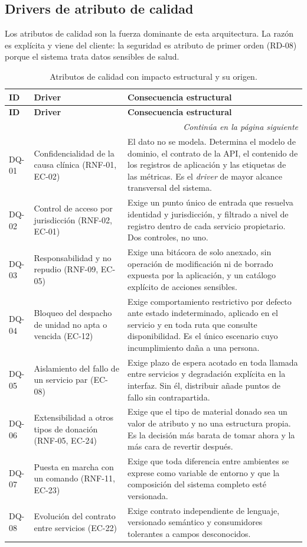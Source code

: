 \documentclass[11pt,a4paper]{article}
\newcommand{\contlinea}[1]{\multicolumn{#1}{r}{\footnotesize\itshape Continúa en la página siguiente}}
\begin{document}
\subsection{Drivers de atributo de calidad}

Los atributos de calidad son la fuerza dominante de esta arquitectura. La razón es explícita y viene del cliente: la seguridad es atributo de primer orden (RD-08) porque el sistema trata datos sensibles de salud.

\begin{longtable}{L{1.5cm} L{4.2cm} L{8.8cm}}
\caption{Atributos de calidad con impacto estructural y su origen.}\label{tab:driverscal}\\
\toprule
\textbf{ID} & \textbf{Driver} & \textbf{Consecuencia estructural} \\
\midrule
\endfirsthead
\toprule
\textbf{ID} & \textbf{Driver} & \textbf{Consecuencia estructural} \\
\midrule
\endhead
\midrule
\contlinea{3} \\
\endfoot
\bottomrule
\endlastfoot
DQ-01 & Confidencialidad de la causa clínica (RNF-01, EC-02) & El dato no se modela. Determina el modelo de dominio, el contrato de la API, el contenido de los registros de aplicación y las etiquetas de las métricas. Es el \emph{driver} de mayor alcance transversal del sistema. \\
DQ-02 & Control de acceso por jurisdicción (RNF-02, EC-01) & Exige un punto único de entrada que resuelva identidad y jurisdicción, y filtrado a nivel de registro dentro de cada servicio propietario. Dos controles, no uno. \\
DQ-03 & Responsabilidad y no repudio (RNF-09, EC-05) & Exige una bitácora de solo anexado, sin operación de modificación ni de borrado expuesta por la aplicación, y un catálogo explícito de acciones sensibles. \\
DQ-04 & Bloqueo del despacho de unidad no apta o vencida (EC-12) & Exige comportamiento restrictivo por defecto ante estado indeterminado, aplicado en el servicio y en toda ruta que consulte disponibilidad. Es el único escenario cuyo incumplimiento daña a una persona. \\
DQ-05 & Aislamiento del fallo de un servicio par (EC-08) & Exige plazo de espera acotado en toda llamada entre servicios y degradación explícita en la interfaz. Sin él, distribuir añade puntos de fallo sin contrapartida. \\
DQ-06 & Extensibilidad a otros tipos de donación (RNF-05, EC-24) & Exige que el tipo de material donado sea un valor de atributo y no una estructura propia. Es la decisión más barata de tomar ahora y la más cara de revertir después. \\
DQ-07 & Puesta en marcha con un comando (RNF-11, EC-23) & Exige que toda diferencia entre ambientes se exprese como variable de entorno y que la composición del sistema completo esté versionada. \\
DQ-08 & Evolución del contrato entre servicios (EC-22) & Exige contrato independiente de lenguaje, versionado semántico y consumidores tolerantes a campos desconocidos. \\
\end{longtable}
\end{document}
